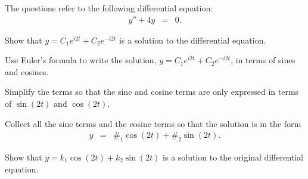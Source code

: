   \begin{problem}

  \item The questions refer to the following differential equation:
    \begin{eqnarray}
      y'' + 4y & = & 0.
    \end{eqnarray}

    \begin{subproblem}
      \item Show that $y=C_1 e^{i2t} + C_2 e^{-i2t}$ is a solution to
        the differential equation.
        \vfill

      \item Use Euler's formula to write the solution, $y=C_1 e^{i2t}
        + C_2 e^{-i2t}$, in terms of sines and cosines.
        \vfill

        \clearpage

      \item Simplify the terms so that the sine and cosine terms are
        only expressed in terms of $\sin(2t)$ and $\cos(2t)$.

        \vfill

      \item Collect all the sine terms and the cosine terms so that
        the solution is in the form
        \begin{eqnarray}
          y & = & \#_1 \cos(2t) + \#_2 \sin(2t).
        \end{eqnarray}
        \vfill

      \item Show that $y=k_1 \cos(2t) + k_2 \sin(2t)$ is a solution to
        the original differential equation.
        \vfill
        

    \end{subproblem}


\end{problem}
